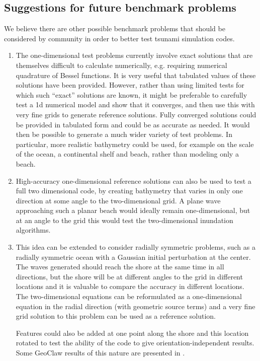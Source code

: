 \subsection{Suggestions for future benchmark problems}

We believe there are other possible benchmark problems that should be
considered by community in order to better test tsunami simulation codes.

\begin{enumerate}
\item The one-dimensional test problems currently involve exact
solutions that are themselves difficult to calculate numerically, e.g.
requiring numerical quadrature of Bessel functions. It is  very
useful that tabulated values of these solutions have been provided.
However, rather than using limited tests for which such ``exact''
solutions are known, it might be preferable to carefully test a 1d
numerical model and show that it converges, and then use this with
very fine grids to generate  reference solutions. 
Fully converged solutions could be provided in tabulated form and could be
as accurate as needed.
It would then be possible to generate a much wider variety of test problems.
In particular, more realistic 
bathymetry could be used, for example on the scale of the
ocean, a continental shelf and beach, rather than modeling only a beach.  

\item High-accuracy one-dimensional reference solutions can also be used to
test a full two dimensional code, by creating bathymetry that varies in only
one direction at some angle to the two-dimensional grid.  A plane wave
approaching such a planar beach would ideally remain one-dimensional, but at
an angle to the grid this would test the two-dimensional inundation
algorithms.

\item This idea 
can be extended to consider radially symmetric problems, such as a
radially symmetric ocean with a Gaussian initial perturbation at the center.
The waves generated should reach the shore at the same time in all
directions, but the shore will be at different angles to the grid in
different locations and it is valuable to compare the accuracy in
different locations. The two-dimensional equations can be reformulated as a
one-dimensional equation in the radial direction (with geometric source
terms) and a very fine grid
solution to this problem can be used as a reference solution.

Features could also be added at one point along the shore and this location
rotated to test the ability of the code to give orientation-independent
results.  Some GeoClaw results of this nature are presented in 
\cite{BergerGeorgeLeVequeMandli:awr11,
LeVequeGeorgeBerger:an11}.


\end{enumerate}
